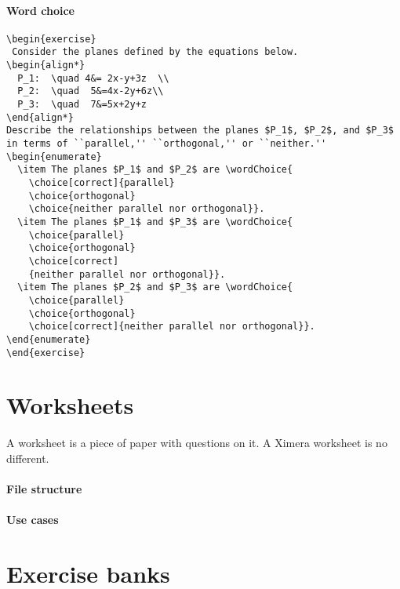 \documentclass{ximera}
\begin{document}
\paragraph{Word choice}
\begin{verbatim}
\begin{exercise}
 Consider the planes defined by the equations below.
\begin{align*}
  P_1:  \quad 4&= 2x-y+3z  \\
  P_2:  \quad  5&=4x-2y+6z\\ 
  P_3:  \quad  7&=5x+2y+z
\end{align*}
Describe the relationships between the planes $P_1$, $P_2$, and $P_3$
in terms of ``parallel,'' ``orthogonal,'' or ``neither.''
\begin{enumerate}
  \item The planes $P_1$ and $P_2$ are \wordChoice{
    \choice[correct]{parallel}
    \choice{orthogonal}
    \choice{neither parallel nor orthogonal}}.
  \item The planes $P_1$ and $P_3$ are \wordChoice{
    \choice{parallel}
    \choice{orthogonal}
    \choice[correct]
    {neither parallel nor orthogonal}}.
  \item The planes $P_2$ and $P_3$ are \wordChoice{
    \choice{parallel}
    \choice{orthogonal}
    \choice[correct]{neither parallel nor orthogonal}}.
\end{enumerate}
\end{exercise}
\end{verbatim}






\section{Worksheets}

A worksheet is a piece of paper with questions on it. A Ximera worksheet is no
different.

\paragraph{File structure}




\paragraph{Use cases}

\section{Exercise banks}
\end{document}
